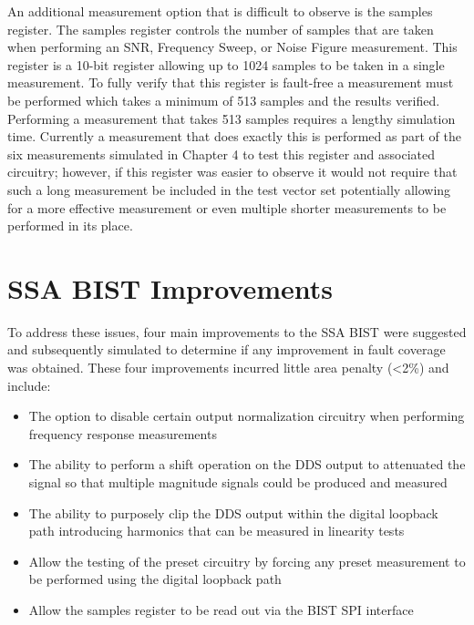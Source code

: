 \documentclass[12pt]{report}
\begin{document}
An additional measurement option that is difficult to observe is the samples register.  The samples register controls the number of samples that are taken when performing an SNR, Frequency Sweep, or Noise Figure measurement.  This register is a 10-bit register allowing up to 1024 samples to be taken in a single measurement.  To fully verify that this register is fault-free a measurement must be performed which takes a minimum of 513 samples and the results verified.  Performing a measurement that takes 513 samples requires a lengthy simulation time.  Currently a measurement that does exactly this is performed as part of the six measurements simulated in Chapter 4 to test this register and associated circuitry; however, if this register was easier to observe it would not require that such a long measurement be included in the test vector set potentially allowing for a more effective measurement or even multiple shorter measurements to be performed in its place.

\section{SSA BIST Improvements}
To address these issues, four main improvements to the SSA BIST were suggested and subsequently simulated to determine if any improvement in fault coverage was obtained.  These four improvements incurred little area penalty (\textless 2\%) and include:
\begin{itemize}
  \item The option to disable certain output normalization circuitry when performing frequency response measurements
  \item The ability to perform a shift operation on the DDS output to attenuated the signal so that multiple magnitude signals could be produced and measured
  \item The ability to purposely clip the DDS output within the digital loopback path introducing harmonics that can be measured in linearity tests
  \item Allow the testing of the preset circuitry by forcing any preset measurement to be performed using the digital loopback path
  \item Allow the samples register to be read out via the BIST SPI interface 
\end{itemize}
\end{document}
